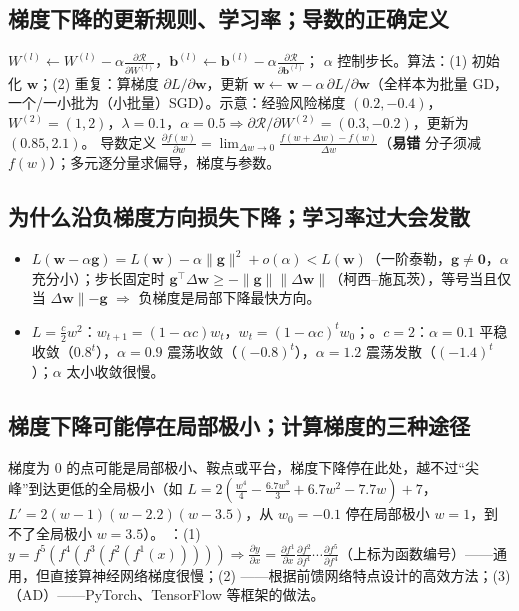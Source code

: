 \subsection{梯度下降的更新规则、学习率；导数的正确定义}
$W^{(l)}\leftarrow W^{(l)}-\alpha\frac{\partial\mathcal R}{\partial W^{(l)}}$，$\bm b^{(l)}\leftarrow\bm b^{(l)}-\alpha\frac{\partial\mathcal R}{\partial\bm b^{(l)}}$； $\alpha$ 控制步长。算法：(1) 初始化 $\bm w$；(2) 重复：算梯度 $\partial L/\partial\bm w$，更新 $\bm w\leftarrow\bm w-\alpha\,\partial L/\partial\bm w$（全样本为批量 GD，一个/一小批为（小批量）SGD）。示意：经验风险梯度 $(0.2,-0.4)$，$W^{(2)}=(1,2)$，$\lambda=0.1$，$\alpha=0.5\Rightarrow\partial\mathcal R/\partial W^{(2)}=(0.3,-0.2)$，更新为 $(0.85,2.1)$。
导数定义 $\frac{\partial f(w)}{\partial w}=\lim_{\Delta w\to0}\frac{f(w+\Delta w)-f(w)}{\Delta w}$（\textbf{易错} 分子须减 $f(w)$）；多元逐分量求偏导，梯度与参数。

\subsection{为什么沿负梯度方向损失下降；学习率过大会发散}
\begin{itemize}
\item $L(\bm w-\alpha\bm g)=L(\bm w)-\alpha\|\bm g\|^2+o(\alpha)<L(\bm w)$（一阶泰勒，$\bm g\ne\bm 0$，$\alpha$ 充分小）；步长固定时 $\bm g^\top\Delta\bm w\ge-\|\bm g\|\|\Delta\bm w\|$（柯西--施瓦茨），等号当且仅当 $\Delta\bm w\parallel-\bm g$ $\Rightarrow$ 负梯度是局部下降最快方向。
\item $L=\frac c2w^2$：$w_{t+1}=(1-\alpha c)w_t$，$w_t=(1-\alpha c)^tw_0$；。$c=2$：$\alpha=0.1$ 平稳收敛（$0.8^t$），$\alpha=0.9$ 震荡收敛（$(-0.8)^t$），$\alpha=1.2$ 震荡发散（$(-1.4)^t$）；$\alpha$ 太小收敛很慢。
\end{itemize}

\subsection{梯度下降可能停在局部极小；计算梯度的三种途径}
梯度为 0 的点可能是局部极小、鞍点或平台，梯度下降停在此处，越不过“尖峰”到达更低的全局极小（如 $L=2(\frac{w^4}4-\frac{6.7w^3}3+6.7w^2-7.7w)+7$，$L'=2(w-1)(w-2.2)(w-3.5)$，从 $w_0=-0.1$ 停在局部极小 $w=1$，到不了全局极小 $w=3.5$）。
：(1)  $y=f^5(f^4(f^3(f^2(f^1(x)))))\Rightarrow\frac{\partial y}{\partial x}=\frac{\partial f^1}{\partial x}\frac{\partial f^2}{\partial f^1}\cdots\frac{\partial f^5}{\partial f^4}$（上标为函数编号）——通用，但直接算神经网络梯度很慢；(2) ——根据前馈网络特点设计的高效方法；(3) （AD）——PyTorch、TensorFlow 等框架的做法。
